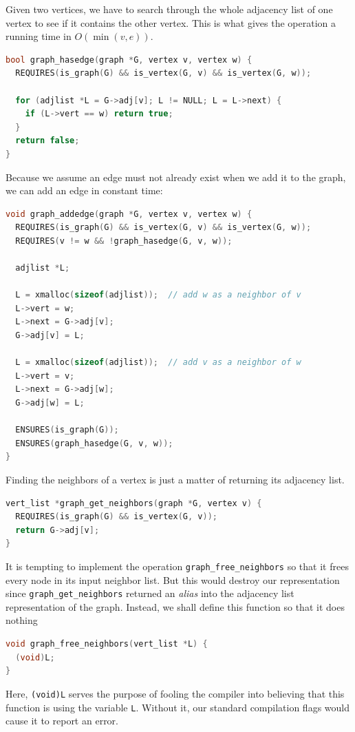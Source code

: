 Given two vertices, we have to search through the whole adjacency list
of one vertex to see if it contains the other vertex. This is what
gives the operation a running time in $O(\min(v,e))$.
\begin{lstlisting}[language=c]
bool graph_hasedge(graph *G, vertex v, vertex w) {
  REQUIRES(is_graph(G) && is_vertex(G, v) && is_vertex(G, w));

  for (adjlist *L = G->adj[v]; L != NULL; L = L->next) {
    if (L->vert == w) return true;
  }
  return false;
}
\end{lstlisting}

Because we assume an edge must not already exist when we add it to the
graph, we can add an edge in constant time:
\begin{lstlisting}[language=c]
void graph_addedge(graph *G, vertex v, vertex w) {
  REQUIRES(is_graph(G) && is_vertex(G, v) && is_vertex(G, w));
  REQUIRES(v != w && !graph_hasedge(G, v, w));

  adjlist *L;

  L = xmalloc(sizeof(adjlist));  // add w as a neighbor of v
  L->vert = w;
  L->next = G->adj[v];
  G->adj[v] = L;

  L = xmalloc(sizeof(adjlist));  // add v as a neighbor of w
  L->vert = v;
  L->next = G->adj[w];
  G->adj[w] = L;

  ENSURES(is_graph(G));
  ENSURES(graph_hasedge(G, v, w));
}
\end{lstlisting}

Finding the neighbors of a vertex is just a matter of returning its
adjacency list.
\begin{lstlisting}[language=c]
vert_list *graph_get_neighbors(graph *G, vertex v) {
  REQUIRES(is_graph(G) && is_vertex(G, v));
  return G->adj[v];
}
\end{lstlisting}

It is tempting to implement the operation
\lstinline'graph_free_neighbors' so that it frees every node in its
input neighbor list.  But this would destroy our representation since
\lstinline'graph_get_neighbors' returned an \emph{alias} into the adjacency
list representation of the graph.  Instead, we shall define this
function so that it does nothing
\begin{lstlisting}[language=c]
void graph_free_neighbors(vert_list *L) {
  (void)L;
}
\end{lstlisting}
Here, \lstinline'(void)L' serves the purpose of fooling the compiler
into believing that this function is using the variable
\lstinline'L'.  Without it, our standard compilation flags would cause
it to report an error.


